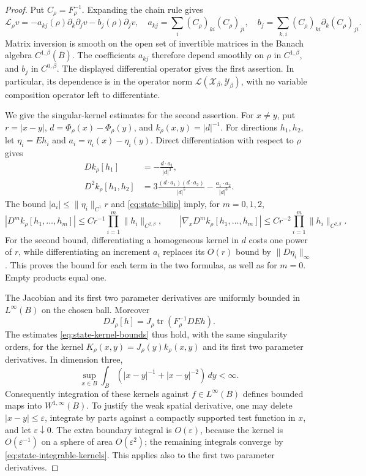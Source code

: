 \documentclass[11pt,a4paper]{article}
\theoremstyle{definition}
\theoremstyle{remark}
\begin{document}
\begin{proof}
Put $C_\rho=F_\rho^{-1}$.  Expanding the chain rule gives
\[
 \mathcal L_\rho v
  =-a_{kj}(\rho)\partial_k\partial_jv
       -b_j(\rho)\partial_jv,
 \quad
 a_{kj}=\sum_i(C_\rho)_{ki}(C_\rho)_{ji},
 \quad
 b_j=\sum_{k,i}(C_\rho)_{ki}\partial_k(C_\rho)_{ji}.
\]
Matrix inversion is smooth on the open set of invertible matrices in
the Banach algebra $C^{1,\beta}(\overline B)$.  The coefficients $a_{kj}$
therefore depend smoothly on $\rho$ in $C^{1,\beta}$, and $b_j$ in
$C^{0,\beta}$.  The displayed differential operator gives the first
assertion.  In particular, its dependence is in the operator norm
$\mathcal L(\mathcal X_\beta,\mathcal Y_\beta)$, with no variable composition operator
left to differentiate.

We give the singular-kernel estimates for the second assertion.  For
$x\ne y$, put $r=|x-y|$, $d=\Phi_\rho(x)-\Phi_\rho(y)$, and
$k_\rho(x,y)=|d|^{-1}$.  For directions $h_1,h_2$, let
$\eta_i=Eh_i$ and $a_i=\eta_i(x)-\eta_i(y)$.  Direct differentiation
with respect to $\rho$ gives
\begin{align*}
 Dk_\rho[h_1]&=-\frac{d\cdot a_1}{|d|^3},\\
 D^2k_\rho[h_1,h_2]
   &=3\frac{(d\cdot a_1)(d\cdot a_2)}{|d|^5}
        -\frac{a_1\cdot a_2}{|d|^3}.
\end{align*}
The bound $|a_i|\leq\|\eta_i\|_{C^1}r$ and
\eqref{eq:state-bilip} imply, for $m=0,1,2$,
\begin{equation}
 |D^mk_\rho[h_1,\ldots,h_m]|
      \leq Cr^{-1}\prod_{i=1}^m\|h_i\|_{C^{2,\beta}},
 \qquad
 |\nabla_xD^mk_\rho[h_1,\ldots,h_m]|
      \leq Cr^{-2}\prod_{i=1}^m\|h_i\|_{C^{2,\beta}}.
 \label{eq:state-kernel-bounds}
\end{equation}
For the second bound, differentiating a homogeneous kernel in $d$ costs
one power of $r$, while differentiating an increment $a_i$ replaces its
$O(r)$ bound by $\|D\eta_i\|_\infty$.  This proves the bound for each
term in the two formulas, as well as for $m=0$.  Empty products equal
one.

The Jacobian and its first two parameter derivatives are uniformly
bounded in $L^\infty(B)$ on the chosen ball.  Moreover
\[
 DJ_\rho[h]=J_\rho\operatorname{tr}(F_\rho^{-1}DEh).
\]
The estimates \eqref{eq:state-kernel-bounds} thus hold, with the same
singularity orders, for the kernel
$K_\rho(x,y)=J_\rho(y)k_\rho(x,y)$ and its first two parameter
derivatives.  In dimension three,
\begin{equation}
 \sup_{x\in B}\int_B(|x-y|^{-1}+|x-y|^{-2})\,dy<\infty.
 \label{eq:state-integrable-kernels}
\end{equation}
Consequently integration of these kernels against $f\in L^\infty(B)$
defines bounded maps into $W^{1,\infty}(B)$.  To justify the weak
spatial derivative, one may delete $|x-y|\leq\varepsilon$, integrate
by parts against a compactly supported test function in $x$, and let
$\varepsilon\downarrow0$.  The extra boundary integral is $O(\varepsilon)$,
because the kernel is $O(\varepsilon^{-1})$ on a sphere of area
$O(\varepsilon^2)$; the remaining integrals converge by
\eqref{eq:state-integrable-kernels}.  This applies also to the first
two parameter derivatives.


\end{proof}
\end{document}
